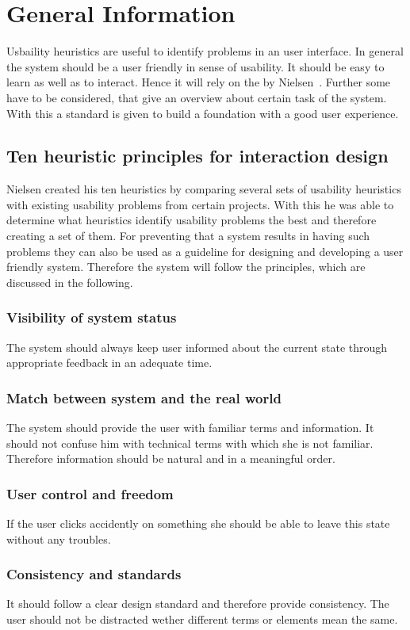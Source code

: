 \section{General Information}\label{4_2_general}
Usbaility heuristics are useful to identify problems in an user interface. In general the system should be a user friendly in sense of usability. It should be easy to learn as well as to interact. Hence it will rely on the \textbf{} by Nielsen~\cite{Nielsen_1994-he}. Further some \textbf{} have to be considered, that give an overview about certain task of the system. With this a standard is given to build a foundation with a good user experience.

\subsection{Ten heuristic principles for interaction design}\label{nielsenDesignPrinciples}
Nielsen created his ten heuristics by comparing several sets of usability heuristics with existing usability problems from certain projects. With this he was able to determine what heuristics identify usability problems the best and therefore creating a set of them. For preventing that a system results in having such problems they can also be used as a guideline for designing and developing a user friendly system. Therefore the system will follow the principles, which are discussed in the following.
\subsubsection{Visibility of system status}
The system should always keep user informed about the current state through appropriate feedback in an adequate time.
\subsubsection{Match between system and the real world}
The system should provide the user with familiar terms and information. It should not confuse him with technical terms with which she is not familiar. Therefore information should be natural and in a meaningful order.
\subsubsection{User control and freedom}
If the user clicks accidently on something she should be able to leave this state without any troubles.
\subsubsection{Consistency and standards}
It should follow a clear design standard and therefore provide consistency. The user should not be distracted wether different terms or elements mean the same.
